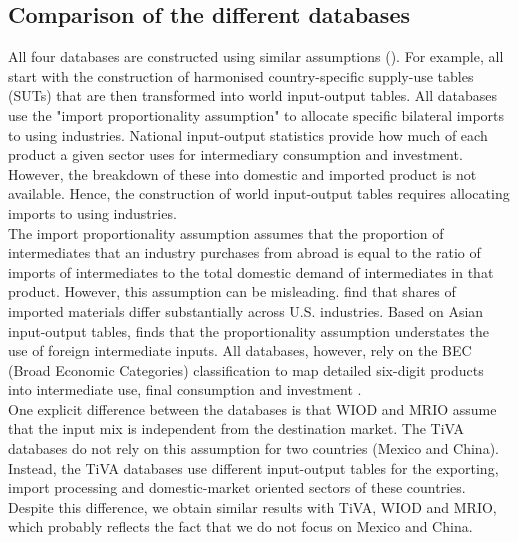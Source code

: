 \documentclass[11pt,a4paper]{paper} %
\begin{document}
\subsection{Comparison of the different databases}
All four databases are constructed using similar assumptions (\cite{OECD2011,Timmer2015,OECD2018}).
For example, all start with the construction of harmonised country-specific supply-use tables (SUTs) that are then transformed into world input-output tables.
All databases use the "import proportionality assumption" to allocate specific bilateral imports to using industries.
National input-output statistics provide how much of each product a given sector uses for intermediary consumption and investment. 
However, the breakdown of these into domestic and imported product is not available. 
Hence, the construction of world input-output tables requires allocating imports to using industries.\\
The import proportionality assumption assumes that the proportion of intermediates that an industry purchases from abroad is equal to the ratio of imports of intermediates to the total domestic demand of intermediates in that product. 
However, this assumption can be misleading. \cite{Feenstra2012} find that shares of imported materials differ substantially across U.S. industries. Based on Asian input-output tables, \cite{Puzzello2012} finds that the proportionality assumption understates the use of foreign intermediate inputs. All databases, however, rely on the BEC (Broad Economic Categories) classification to map detailed six-digit products into intermediate use, final consumption and investment \citep{Dietzenbacher2013}. \\
One explicit difference between the databases is that WIOD and MRIO assume that the input mix is independent from the destination market. 
The TiVA databases do not rely on this assumption for two countries (Mexico and China). Instead, the TiVA databases use different input-output tables for the exporting, import processing and domestic-market oriented sectors of these countries. Despite this difference, we obtain similar results with TiVA, WIOD and MRIO, which probably reflects the fact that we do not focus on Mexico and China.\\
\end{document}
